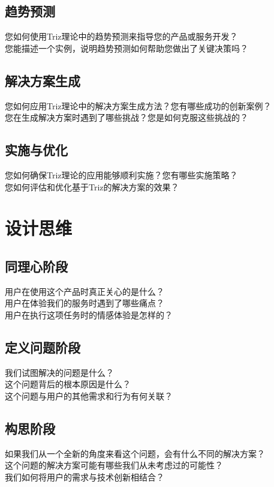 \documentclass[12pt]{book}
\begin{document}
\subsection{趋势预测}
您如何使用Triz理论中的趋势预测来指导您的产品或服务开发？\\
您能描述一个实例，说明趋势预测如何帮助您做出了关键决策吗？\\
\subsection{解决方案生成}
您如何应用Triz理论中的解决方案生成方法？您有哪些成功的创新案例？\\
您在生成解决方案时遇到了哪些挑战？您是如何克服这些挑战的？\\
\subsection{实施与优化}
您如何确保Triz理论的应用能够顺利实施？您有哪些实施策略？\\
您如何评估和优化基于Triz的解决方案的效果？\\

\section{设计思维}
\subsection{同理心阶段}
用户在使用这个产品时真正关心的是什么？\\
用户在体验我们的服务时遇到了哪些痛点？\\
用户在执行这项任务时的情感体验是怎样的？\\
\subsection{定义问题阶段}
我们试图解决的问题是什么？\\
这个问题背后的根本原因是什么？\\
这个问题与用户的其他需求和行为有何关联？\\
\subsection{构思阶段}
如果我们从一个全新的角度来看这个问题，会有什么不同的解决方案？\\
这个问题的解决方案可能有哪些我们从未考虑过的可能性？\\
我们如何将用户的需求与技术创新相结合？\\
\end{document}
